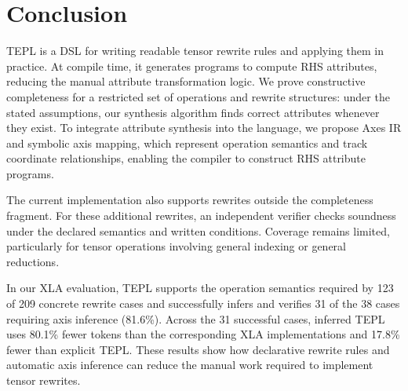 \section{Conclusion}
\label{sec:conclusion}
TEPL is a DSL for writing readable tensor rewrite rules and applying them
in practice. At compile time, it generates programs to compute RHS
attributes, reducing the manual attribute transformation logic. We prove
constructive completeness for a restricted set of operations and rewrite
structures: under the stated assumptions, our synthesis algorithm finds
correct attributes whenever they exist. To integrate attribute synthesis
into the language, we propose Axes IR and symbolic axis mapping, which
represent operation semantics and track coordinate relationships, enabling
the compiler to construct RHS attribute programs.

The current implementation also supports rewrites outside the completeness
fragment. For these additional rewrites, an
independent verifier checks soundness under the declared semantics and
written conditions. Coverage remains limited, particularly for tensor
operations involving general indexing or general reductions.

In our XLA evaluation, TEPL supports the operation semantics required by
123 of 209 concrete rewrite cases and successfully infers and verifies
31 of the 38 cases requiring axis inference (81.6\%). Across the 31
successful cases, inferred TEPL uses 80.1\% fewer tokens than the
corresponding XLA implementations and 17.8\% fewer than explicit TEPL.
These results show how declarative rewrite rules and automatic axis
inference can reduce the manual work required to implement tensor rewrites.
